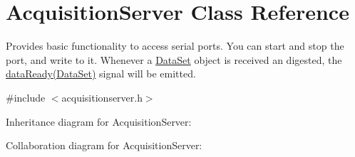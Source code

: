 \hypertarget{classAcquisitionServer}{\section{Acquisition\+Server Class Reference}
\label{classAcquisitionServer}
}


Provides basic functionality to access serial ports. You can start and stop the port, and write to it. Whenever a \hyperlink{classDataSet}{Data\+Set} object is received an digested, the \hyperlink{classAcquisitionServer_afe942f82316df744efea514192eab408}{data\+Ready(\+Data\+Set)} signal will be emitted.  




{\ttfamily \#include $<$acquisitionserver.\+h$>$}



Inheritance diagram for Acquisition\+Server\+:


Collaboration diagram for Acquisition\+Server\+:
